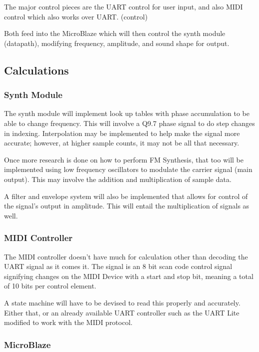 \documentclass[12pt]{article}
\begin{document}
The major control pieces are the UART control for user input, and also MIDI control which also works over UART. (control)

Both feed into the MicroBlaze which will then control the synth module (datapath), modifying frequency, amplitude, and sound shape for output.

\subsection{Calculations}

\subsubsection{Synth Module}

The synth module will implement look up tables with phase accumulation to be able to change frequency. This will involve a Q9.7 phase signal to do step changes in indexing. Interpolation may be implemented to help make the signal more accurate; however, at higher sample counts, it may not be all that necessary.

Once more research is done on how to perform FM Synthesis, that too will be implemented using low frequency oscillators to modulate the carrier signal (main output). This may involve the addition and multiplication of sample data.

A filter and envelope system will also be implemented that allows for control of the signal's output in amplitude. This will entail the multiplication of signals as well.

\subsubsection{MIDI Controller}

The MIDI controller doesn't have much for calculation other than decoding the UART signal as it comes it. The signal is an 8 bit scan code control signal signifying changes on the MIDI Device with a start and stop bit, meaning a total of 10 bits per control element.

A state machine will have to be devised to read this properly and accurately. Either that, or an already available UART controller such as the UART Lite modified to work with the MIDI protocol.

\subsubsection{MicroBlaze}
\end{document}
